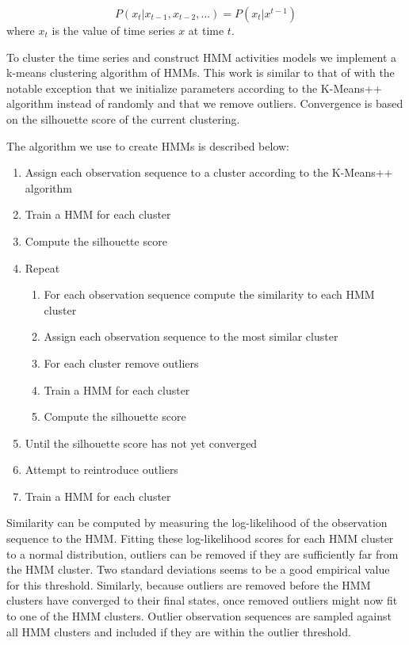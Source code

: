 \begin{equation}
\label{eq:markov}
P(x_{t}|x_{t - 1}, x_{t-2}, ...) = P(x_{t}|x^{t - 1})
\end{equation}
\noindent
where $x_{t}$ is the value of time series $x$ at time $t$.

To cluster the time series and construct HMM activities models we implement a k-means clustering algorithm of HMMs.  This work is similar to that of \cite{Wren2006a} with the notable exception that we initialize parameters according to the K-Means++ algorithm \cite{Arthur2007} instead of randomly and that we remove outliers.  Convergence is based on the silhouette \cite{Kaufman1990} score of the current clustering.  

{\singlespace
The algorithm we use to create HMMs is described below:
\begin{enumerate}
\item{Assign each observation sequence to a cluster according to the K-Means++ algorithm}
\item{Train a HMM for each cluster}
\item{Compute the silhouette score}
\item{Repeat}
\begin{enumerate}
\item{For each observation sequence compute the similarity to each HMM cluster}
\item{Assign each observation sequence to the most similar cluster}
\item{For each cluster remove outliers}
\item{Train a HMM for each cluster}
\item{Compute the silhouette score}
\end{enumerate}
\item{Until the silhouette score has not yet converged}
\item{Attempt to reintroduce outliers}
\item{Train a HMM for each cluster}
\end{enumerate}
}

Similarity can be computed by measuring the log-likelihood of the observation sequence to the HMM.  Fitting these log-likelihood scores for each HMM cluster to a normal distribution, outliers can be removed if they are sufficiently far from the HMM cluster.  Two standard deviations seems to be a good empirical value for this threshold.  Similarly, because outliers are removed before the HMM clusters have converged to their final states, once removed outliers might now fit to one of the HMM clusters.  Outlier observation sequences are sampled against all HMM clusters and included if they are within the outlier threshold.

